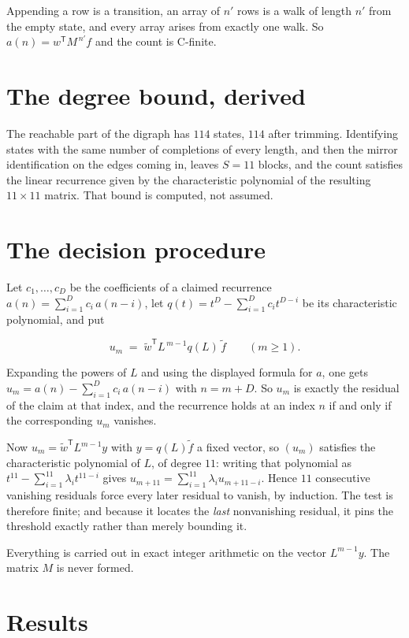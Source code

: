 \documentclass[11pt]{article}
\theoremstyle{definition}
\begin{document}
Appending a row is a transition, an array of $n'$ rows is a walk of length $n'$ from the empty state, and every array arises from exactly one walk. So $a(n) = w^{\mathsf T}M^{\,n'}f$ and the count is C-finite.

\section{The degree bound, derived}

The reachable part of the digraph has $114$ states, $114$ after trimming. Identifying states with the same number of completions of every length, and then the mirror identification on the edges coming in, leaves $S = 11$ blocks, and the count satisfies the linear recurrence given by the characteristic polynomial of the resulting $11\times11$ matrix. That bound is computed, not assumed.

\section{The decision procedure}

Let $c_1,\dots,c_D$ be the coefficients of a claimed recurrence $a(n) = \sum_{i=1}^{D} c_i\,a(n-i)$, let $q(t) = t^{D} - \sum_{i=1}^{D} c_i t^{D-i}$ be its characteristic polynomial, and put

\[u_m \;=\; \tilde w^{\mathsf T} L^{\,m-1} q(L)\,\tilde f \qquad (m \ge 1).\]

Expanding the powers of $L$ and using the displayed formula for $a$, one gets $u_m = a(n) - \sum_{i=1}^{D} c_i\,a(n-i)$ with $n = m + D$. So $u_m$ is exactly the residual of the claim at that index, and the recurrence holds at an index $n$ if and only if the corresponding $u_m$ vanishes.

Now $u_m = \tilde w^{\mathsf T} L^{m-1} y$ with $y = q(L)\tilde f$ a fixed vector, so $(u_m)$ satisfies the characteristic polynomial of $L$, of degree $11$: writing that polynomial as $t^{11} - \sum_{i=1}^{11} \lambda_i t^{11-i}$ gives $u_{m+11} = \sum_{i=1}^{11} \lambda_i u_{m+11-i}$. Hence $11$ consecutive vanishing residuals force every later residual to vanish, by induction. The test is therefore finite; and because it locates the {\itshape last} nonvanishing residual, it pins the threshold exactly rather than merely bounding it.

Everything is carried out in exact integer arithmetic on the vector $L^{m-1}y$. The matrix $M$ is never formed.

\section{Results}
\end{document}
